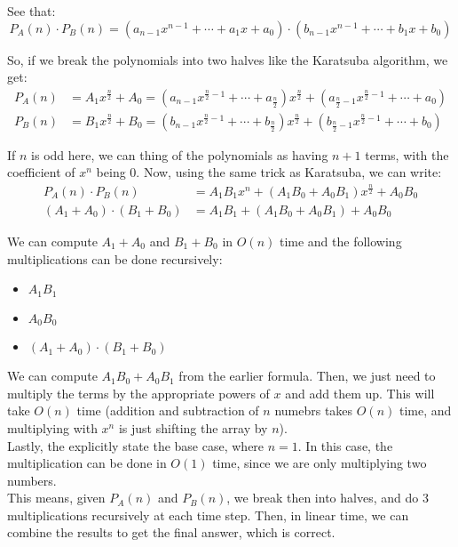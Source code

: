 \documentclass[a4paper]{article}
\begin{document}
\noindent See that:
\[
    P_A(n) \cdot P_B(n) = (a_{n-1}x^{n-1} + \cdots + a_1x + a_0) \cdot (b_{n-1}x^{n-1} + \cdots + b_1x + b_0)
\]

\vspace{0.25em}
\noindent So, if we break the polynomials into two halves like the Karatsuba algorithm, we get:
\begin{align*}
    P_A(n) &= A_1x^{\frac{n}{2}} + A_0 = (a_{n-1}x^{\frac{n}{2} - 1} + \cdots + a_{\frac{n}{2}})x^{\frac{n}{2}} + (a_{\frac{n}{2}-1}x^{\frac{n}{2}-1} + \cdots + a_0) \\
    P_B(n) &= B_1x^{\frac{n}{2}} + B_0 = (b_{n-1}x^{\frac{n}{2} - 1} + \cdots + b_{\frac{n}{2}})x^{\frac{n}{2}} + (b_{\frac{n}{2}-1}x^{\frac{n}{2}-1} + \cdots + b_0)
\end{align*}

\noindent If $n$ is odd here, we can thing of the polynomials as having $n+1$ terms, with the coefficient of $x^n$ being 0. Now, using the same trick as Karatsuba, we can write:
\begin{align*}
    P_A(n) \cdot P_B(n) &= A_1B_1x^n + (A_1B_0 + A_0B_1)x^{\frac{n}{2}} + A_0B_0 \\
    (A_1 + A_0) \cdot (B_1 + B_0) &= A_1B_1 + (A_1B_0 + A_0B_1) + A_0B_0
\end{align*}

\noindent We can compute $A_1 + A_0$ and $B_1 + B_0$ in $O(n)$ time and the following multiplications can be done recursively:

\begin{itemize}
    \item $A_1B_1$
    \item $A_0B_0$
    \item $(A_1 + A_0) \cdot (B_1 + B_0)$
\end{itemize}

\noindent We can compute $A_1B_0 + A_0B_1$ from the earlier formula. Then, we just need to multiply the terms by the appropriate powers of $x$ and add them up. This will take $O(n)$ time (addition and subtraction of $n$ numebrs takes $O(n)$ time, and multiplying with $x^n$ is just shifting the array by $n$). \\

\noindent Lastly, the explicitly state the base case, where $n = 1$. In this case, the multiplication can be done in $O(1)$ time, since we are only multiplying two numbers. \\

\noindent This means, given $P_A(n)$ and $P_B(n)$, we break then into halves, and do 3 multiplications recursively at each time step. Then, in linear time, we can combine the results to get the final answer, which is correct.
\end{document}
